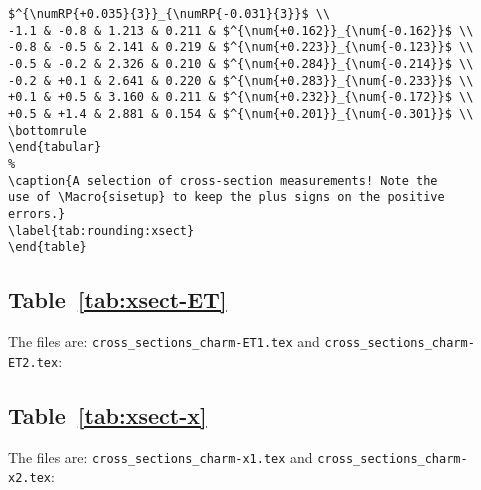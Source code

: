 \documentclass[UKenglish]{style/atlasdoc}
\newcommand*{\numRP}[2]{\num[round-mode=places, round-precision=#2]{#1}}
\newcommand*\Macro[1]{\texttt{\textbackslash#1}}
\begin{document}
\begin{verbatim}
$^{\numRP{+0.035}{3}}_{\numRP{-0.031}{3}}$ \\
-1.1 & -0.8 & 1.213 & 0.211 & $^{\num{+0.162}}_{\num{-0.162}}$ \\
-0.8 & -0.5 & 2.141 & 0.219 & $^{\num{+0.223}}_{\num{-0.123}}$ \\
-0.5 & -0.2 & 2.326 & 0.210 & $^{\num{+0.284}}_{\num{-0.214}}$ \\
-0.2 & +0.1 & 2.641 & 0.220 & $^{\num{+0.283}}_{\num{-0.233}}$ \\
+0.1 & +0.5 & 3.160 & 0.211 & $^{\num{+0.232}}_{\num{-0.172}}$ \\
+0.5 & +1.4 & 2.881 & 0.154 & $^{\num{+0.201}}_{\num{-0.301}}$ \\
\bottomrule
\end{tabular}
%
\caption{A selection of cross-section measurements! Note the
use of \Macro{sisetup} to keep the plus signs on the positive
errors.}
\label{tab:rounding:xsect}
\end{table}
\end{verbatim}

\subsection{Table~\protect\ref{tab:xsect-ET}}
The files are: \texttt{cross\_sections\_charm-ET1.tex} and 
\texttt{cross\_sections\_charm-ET2.tex}:
{\scriptsize
  
}
{\scriptsize
  
}

\subsection{Table~\protect\ref{tab:xsect-x}}

The files are: \texttt{cross\_sections\_charm-x1.tex} and 
\texttt{cross\_sections\_charm-x2.tex}:
{\scriptsize
  
}
{\tiny
  
}

\printbibliography
\end{document}
